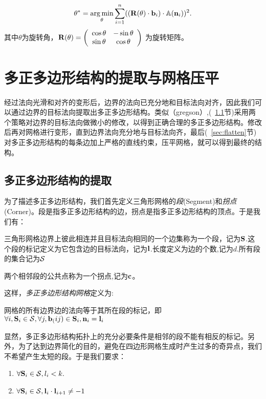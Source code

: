 \begin{equation}\label{equ:rot}
\theta^*=\mathop{\operatorname*{arg\,min}}_{\theta}{\sum_{i=1}^n ( (\mathbf{R}(\theta) \cdot \mathbf{b}_i) \cdot \operatorname*{\mathbb{A}}(\mathbf{n}_i))^2.}
\end{equation}
其中$\theta$为旋转角，$\mathbf{R}(\theta)=\left(\begin{array}{cc}
\cos\theta & -\sin\theta \\ 
\sin\theta & \cos\theta
\end{array}\right) $
为旋转矩阵。

\section{多正多边形结构的提取与网格压平}\label{sec:labeling_flatten}
经过法向光滑和对齐的变形后，边界的法向已充分地和目标法向对齐，因此我们可以通过边界的目标法向提取出多正多边形结构。类似（gregson）,(~\ref{sec:labeling}节)采用两个策略对边界的目标法向做微小的修改，以得到正确合理的多正多边形结构。修改后再对网格进行变形，直到边界法向充分地与目标法向齐，最后(~\ref{sec:flatten}节)对多正多边形结构的每条边加上严格的直线约束，压平网格，就可以得到最终的结构。

\subsection{多正多边形结构的提取}\label{sec:labeling}
为了描述多正多边形结构，我们首先定义三角形网格的\emph{段}(Segment)和\emph{拐点}(Corner)。段是指多正多边形结构的边，拐点是指多正多边形结构的顶点。于是我们有：
\begin{definition}\label{def:seg}
三角形网格边界上彼此相连并且目标法向相同的一个边集称为一个段，记为$\mathbf{S}$.这个段的标记定义为它包含边的目标法向，记为$\mathbf{l}$.长度定义为边的个数,记为$d$.所有段的集合记为$\mathcal{S}$
\end{definition}

\begin{definition}\label{def:corner}
两个相邻段的公共点称为一个拐点,记为$\mathbf{c}$。
\end{definition}
这样，\emph{多正多边形结构网格}定义为:
\begin{definition}
	网格的所有边界边的法向等于其所在段的标记，即
	$\forall i, \mathbf{S}_i \in \mathcal{S}, \forall j, \mathbf{b}_(ij) \in \mathbf{S}_i, \mathbf{n}_i = \mathbf{l}_i$
\end{definition}
显然，多正多边形结构拓扑上的充分必要条件是相邻的段不能有相反的标记。另外，为了达到边界简化的目的，避免在四边形网格生成时产生过多的奇异点，我们不希望产生太短的段。于是我们要求：
\begin{enumerate}
	\item $\forall \mathbf{S}_i \in \mathcal{S},l_i<k.$\
	\item $\forall \mathbf{S}_i \in \mathcal{S},\mathbf{l}_i \cdot \mathbf{l}_{i+1} \not=-1 $
\end{enumerate}

